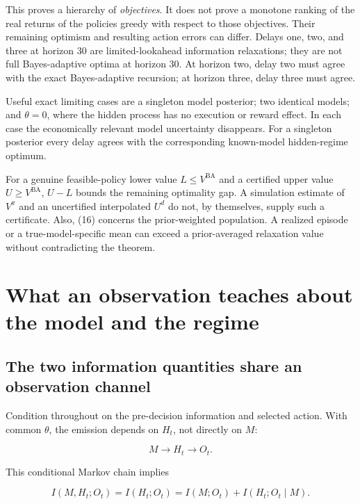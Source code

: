 \documentclass[10pt,a4paper]{article}
\begin{document}
This proves a hierarchy of \emph{objectives}. It does not prove a monotone ranking
of the real returns of the policies greedy with respect to those objectives.
Their remaining optimism and resulting action errors can differ. Delays one,
two, and three at horizon 30 are limited-lookahead information relaxations;
they are not full Bayes-adaptive optima at horizon 30. At horizon two, delay two
must agree with the exact Bayes-adaptive recursion; at horizon three, delay
three must agree.

Useful exact limiting cases are a singleton model posterior; two identical
models; and $\theta=0$, where the hidden process has no execution or reward
effect. In each case the economically relevant model uncertainty disappears.
For a singleton posterior every delay agrees with the corresponding
known-model hidden-regime optimum.

For a genuine feasible-policy lower value $L\le V^{\mathrm{BA}}$ and a
certified upper value $U\ge V^{\mathrm{BA}}$, $U-L$ bounds the remaining
optimality gap. A simulation estimate of $V^\pi$ and an uncertified
interpolated $U^d$ do not, by themselves, supply such a certificate. Also,
(16) concerns the prior-weighted population. A realized episode or a
true-model-specific mean can exceed a prior-averaged relaxation value without
contradicting the theorem.

\section{What an observation teaches about the model and the regime}

\subsection{The two information quantities share an observation channel}

Condition throughout on the pre-decision information and selected action. With
common $\theta$, the emission depends on $H_t$, not directly on $M$:

\begin{equation}
M\longrightarrow H_t\longrightarrow O_t.
\tag{17}
\end{equation}

This conditional Markov chain implies

\begin{equation}
I(M,H_t;O_t)=I(H_t;O_t)
=I(M;O_t)+I(H_t;O_t\mid M).
\tag{18}
\end{equation}
\end{document}

